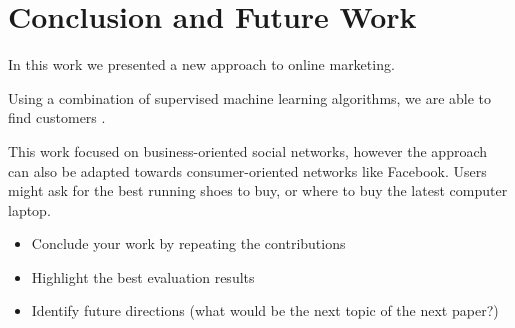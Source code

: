 \section{Conclusion and Future Work}

In this work we presented a new approach to online marketing.

Using a combination of supervised machine learning algorithms, we are able to find customers .

This work focused on business-oriented social networks, however the approach can also be adapted towards consumer-oriented networks like Facebook.
Users might ask for the best running shoes to buy, or where to buy the latest computer laptop.

\label{sec:conclusion}
\begin{itemize}
	\item Conclude your work by repeating the contributions
	\item Highlight the best evaluation results
	\item Identify future directions (what would be the next topic of the next paper?)
\end{itemize}
